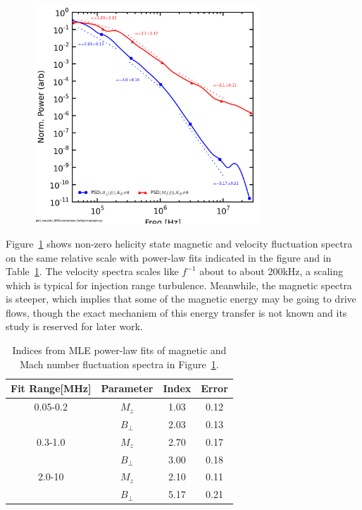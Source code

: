 \documentclass[aip,prl,amsmath,amssymb,reprint,superscriptaddress]{revtex4-1} %
\begin{document}
\begin{figure}[!htbp]
\centerline{
\includegraphics[width=8.5cm]{BvsFlowspec_wFits_40t60us}}
\caption{\label{fig:BvsFlow_wFits}}
\end{figure}

Figure~\ref{fig:BvsFlow_wFits} shows non-zero helicity state magnetic and velocity fluctuation spectra on the same relative scale with power-law fits indicated in the figure and in Table~\ref{tab:BMindices}. The velocity spectra scales like $f^{-1}$ about to about 200kHz, a scaling which is typical for injection range turbulence. Meanwhile, the magnetic spectra is steeper, which implies that some of the magnetic energy may be going to drive flows, though the exact mechanism of this energy transfer is not known and its study is reserved for later work.

\begin{table}
\caption{\label{tab:BMindices}Indices from MLE power-law fits of magnetic and Mach number fluctuation spectra in Figure~\ref{fig:BvsFlow_wFits}.}
\begin{tabular}{cccc}
\toprule
Fit Range[MHz]	&	Parameter		&	Index	&Error\\
\hline
0.05-0.2				& $M_{z}$			& 1.03	&0.12\\
								& $B_{\perp}$	& 2.03  &0.13\\
\hline
0.3-1.0					& $M_{z}$			& 2.70	&0.17\\
								& $B_{\perp}$	& 3.00  &0.18\\
\hline
2.0-10					& $M_{z}$			& 2.10	&0.11\\
								& $B_{\perp}$	& 5.17  &0.21\\
\hline
\end{tabular}
\end{table}
\end{document}
